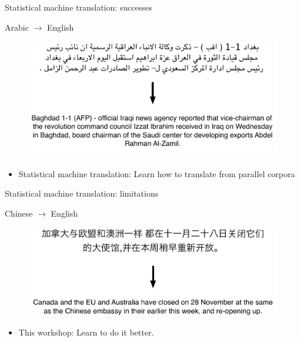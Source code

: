 \documentclass{beamer}
\begin{document}
\begin{frame}[t]{Statistical machine translation: successes}
\begin{exampleblock}{Arabic $\rightarrow$ English}
  \begin{figure}
    {\centering \includegraphics[scale=0.55]{arabic-good.pdf}}
  \end{figure}
\end{exampleblock}
\begin{itemize}
  \item Statistical machine translation: Learn how to translate from parallel corpora 
\end{itemize}
\end{frame}

\begin{frame}[t]{Statistical machine translation: limitations}
\begin{alertblock}{Chinese $\rightarrow$ English}
  \begin{figure}
    {\centering \includegraphics[scale=0.7]{chinese-bad.pdf}}
  \end{figure}
\end{alertblock}
\begin{itemize}
  \item This workshop: Learn to do it better.
\end{itemize}
\end{frame}
\end{document}
